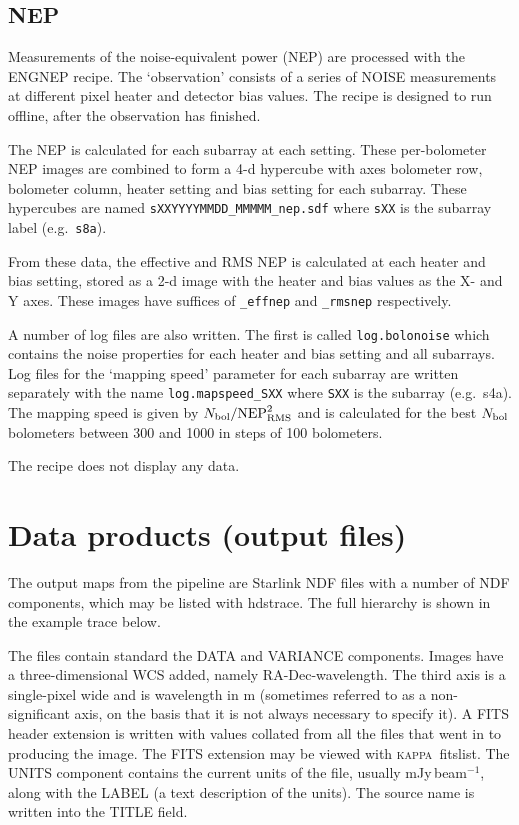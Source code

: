 \documentclass[twoside,11pt]{article}
\newcommand{\xlabel}[1]{}
\renewcommand{\_}{\texttt{\symbol{95}}}
\newcommand{\KAPPA}{\textsc{kappa}}
\newcommand{\task}[1]{\textsf{#1}}
\begin{document}
\subsection{NEP}

Measurements of the noise-equivalent power (NEP) are processed with
the \task{ENG\_NEP} recipe. The `observation' consists of a series of
NOISE measurements at different pixel heater and detector bias
values. The recipe is designed to run offline, after the observation
has finished.

The NEP is calculated for each subarray at each setting. These
per-bolometer NEP images are combined to form a 4-d hypercube with
axes bolometer row, bolometer column, heater setting and bias setting
for each subarray. These hypercubes are named
\verb+sXXYYYYMMDD_MMMMM_nep.sdf+ where \verb+sXX+ is the subarray
label (e.g.\ \verb+s8a+).

From these data, the effective and RMS NEP is calculated at each
heater and bias setting, stored as a 2-d image with the heater and
bias values as the X- and Y axes. These images have suffices of
\verb+_effnep+ and \verb+_rmsnep+ respectively.

A number of log files are also written. The first is called
\verb+log.bolonoise+ which contains the noise properties for each
heater and bias setting and all subarrays. Log files for the `mapping
speed' parameter for each subarray are written separately with the
name \verb+log.mapspeed_SXX+ where \verb+SXX+ is the subarray
(e.g.\ s4a). The mapping speed is given by $N_{\rm bol} / {\rm
  NEP}_{\rm RMS}^2$ and is calculated for the best $N_{\rm bol}$
bolometers between 300 and 1000 in steps of 100 bolometers.

The recipe does not display any data.

\section{\xlabel{dataproducts}Data products (output files)\label{se:dataprod}}

The output maps from the pipeline are Starlink NDF files with a number
of NDF components, which may be listed with \task{hdstrace}. The
full hierarchy is shown in the example trace below.

The files contain standard the DATA and VARIANCE components. Images
have a three-dimensional WCS added, namely RA-Dec-wavelength. The
third axis is a single-pixel wide and is wavelength in m (sometimes
referred to as a non-significant axis, on the basis that it is not
always necessary to specify it). A FITS header extension is written
with values collated from all the files that went in to producing the
image. The FITS extension may be viewed with
\KAPPA\ \task{fitslist}. The UNITS component contains the current units
of the file, usually mJy\,beam$^{-1}$, along with the LABEL (a text
description of the units). The source name is written into the TITLE
field.
\end{document}
